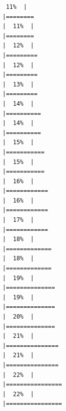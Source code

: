 \documentclass[
  ignorenonframetext,
]{beamer}
\begin{document}
\begin{frame}[fragile]{}
\begin{verbatim}
 11%  |                                                                              |========                                                              |  11%  |                                                                              |========                                                              |  12%  |                                                                              |=========                                                             |  12%  |                                                                              |=========                                                             |  13%  |                                                                              |=========                                                             |  14%  |                                                                              |==========                                                            |  14%  |                                                                              |==========                                                            |  15%  |                                                                              |===========                                                           |  15%  |                                                                              |===========                                                           |  16%  |                                                                              |============                                                          |  16%  |                                                                              |============                                                          |  17%  |                                                                              |============                                                          |  18%  |                                                                              |=============                                                         |  18%  |                                                                              |=============                                                         |  19%  |                                                                              |==============                                                        |  19%  |                                                                              |==============                                                        |  20%  |                                                                              |==============                                                        |  21%  |                                                                              |===============                                                       |  21%  |                                                                              |===============                                                       |  22%  |                                                                              |================                                                      |  22%  |                                                                              |================                                
\end{verbatim}
\end{frame}
\end{document}
